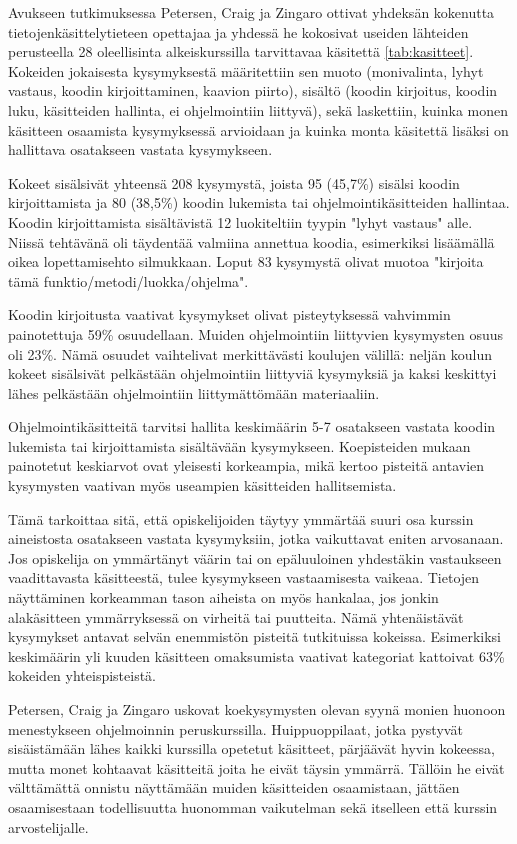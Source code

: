 \documentclass[finnish]{../tktltiki2}
\theoremstyle{definition}
\theoremstyle{remark}
\begin{document}
Avukseen tutkimuksessa Petersen, Craig ja Zingaro ottivat yhdeksän kokenutta tietojenkäsittelytieteen opettajaa ja yhdessä he kokosivat useiden lähteiden perusteella 28 oleellisinta alkeiskurssilla tarvittavaa käsitettä \ref{tab:kasitteet}. Kokeiden jokaisesta kysymyksestä määritettiin sen muoto (monivalinta, lyhyt vastaus, koodin kirjoittaminen, kaavion piirto), sisältö (koodin kirjoitus, koodin luku, käsitteiden hallinta, ei ohjelmointiin liittyvä), sekä laskettiin, kuinka monen käsitteen osaamista kysymyksessä arvioidaan ja kuinka monta käsitettä lisäksi on hallittava osatakseen vastata kysymykseen.

Kokeet sisälsivät yhteensä 208 kysymystä, joista 95 (45,7\%) sisälsi koodin kirjoittamista ja 80 (38,5\%) koodin lukemista tai ohjelmointikäsitteiden hallintaa. Koodin kirjoittamista sisältävistä 12 luokiteltiin tyypin "lyhyt vastaus" alle. Niissä tehtävänä oli täydentää valmiina annettua koodia, esimerkiksi lisäämällä oikea lopettamisehto silmukkaan. Loput 83 kysymystä olivat muotoa "kirjoita tämä funktio/metodi/luokka/ohjelma".

Koodin kirjoitusta vaativat kysymykset olivat pisteytyksessä vahvimmin painotettuja 59\% osuudellaan. Muiden ohjelmointiin liittyvien kysymysten osuus oli 23\%. Nämä osuudet vaihtelivat merkittävästi koulujen välillä: neljän koulun kokeet sisälsivät pelkästään ohjelmointiin liittyviä kysymyksiä ja kaksi keskittyi lähes pelkästään ohjelmointiin liittymättömään materiaaliin.

Ohjelmointikäsitteitä tarvitsi hallita keskimäärin 5-7 osatakseen vastata koodin lukemista tai kirjoittamista sisältävään kysymykseen. Koepisteiden mukaan painotetut keskiarvot ovat yleisesti korkeampia, mikä kertoo pisteitä antavien kysymysten vaativan myös useampien käsitteiden hallitsemista.

Tämä tarkoittaa sitä, että opiskelijoiden täytyy ymmärtää suuri osa kurssin aineistosta osatakseen vastata kysymyksiin, jotka vaikuttavat eniten arvosanaan. Jos opiskelija on ymmärtänyt väärin tai on epäluuloinen yhdestäkin vastaukseen vaadittavasta käsitteestä, tulee kysymykseen vastaamisesta vaikeaa. Tietojen näyttäminen korkeamman tason aiheista on myös hankalaa, jos jonkin alakäsitteen ymmärryksessä on virheitä tai puutteita. Nämä yhtenäistävät kysymykset antavat selvän enemmistön pisteitä tutkituissa kokeissa. Esimerkiksi keskimäärin yli kuuden käsitteen omaksumista vaativat kategoriat kattoivat 63\% kokeiden yhteispisteistä.

Petersen, Craig ja Zingaro uskovat koekysymysten olevan syynä monien huonoon menestykseen ohjelmoinnin peruskurssilla. Huippuoppilaat, jotka pystyvät sisäistämään lähes kaikki kurssilla opetetut käsitteet, pärjäävät hyvin kokeessa, mutta monet kohtaavat käsitteitä joita he eivät täysin ymmärrä. Tällöin he eivät välttämättä onnistu näyttämään muiden käsitteiden osaamistaan, jättäen osaamisestaan todellisuutta huonomman vaikutelman sekä itselleen että kurssin arvostelijalle.
\end{document}
